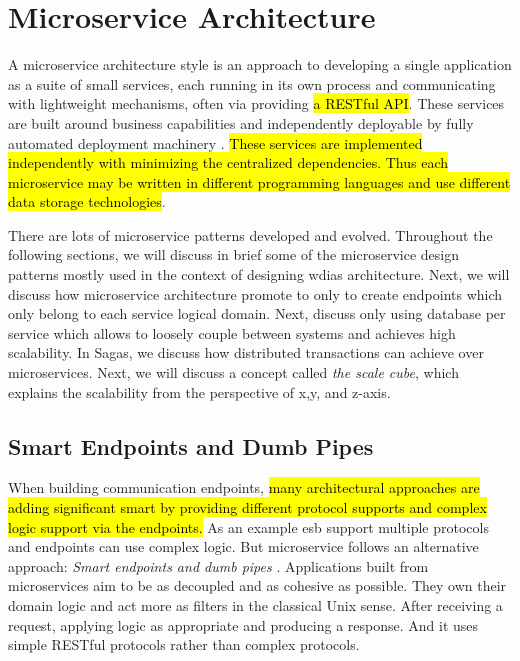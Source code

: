 \section{Microservice Architecture}
\label{se:microservice}

A microservice architecture style is an approach to developing a single application as a suite of small services, each running in its own process and communicating with lightweight mechanisms, often via providing \hl{a RESTful API}. These services are built around business capabilities and independently deployable by fully automated deployment machinery \cite{LewisMicroservices}. \hl{These services are implemented independently with minimizing the centralized dependencies. Thus each microservice may be written in different programming languages and use different data storage technologies}.


There are lots of microservice patterns developed and evolved. Throughout the following sections, we will discuss in brief some of the microservice design patterns mostly used in the context of designing \acrshort{wdias} architecture. Next, we will discuss how microservice architecture promote to only to create endpoints which only belong to each service logical domain. Next, discuss only using database per service which allows to loosely couple between systems and achieves high scalability. In Sagas, we discuss how distributed transactions can achieve over microservices. Next, we will discuss a concept called \emph{the scale cube}, which explains the scalability from the perspective of x,y, and z-axis.


\subsection{Smart Endpoints and Dumb Pipes}
\label{subse:dumb_pipes}

When building communication endpoints, \hl{many architectural approaches are adding significant smart by providing different protocol supports and complex logic support via the endpoints.} As an example \acrshort{esb} support multiple protocols and endpoints can use complex logic. But microservice follows an alternative approach: \emph{Smart endpoints and dumb pipes} \cite{LewisMicroservicesPipes}.
Applications built from microservices aim to be as decoupled and as cohesive as possible. They own their domain logic and act more as filters in the classical Unix sense. After receiving a request, applying logic as appropriate and producing a response. And it uses simple RESTful protocols rather than complex protocols.

